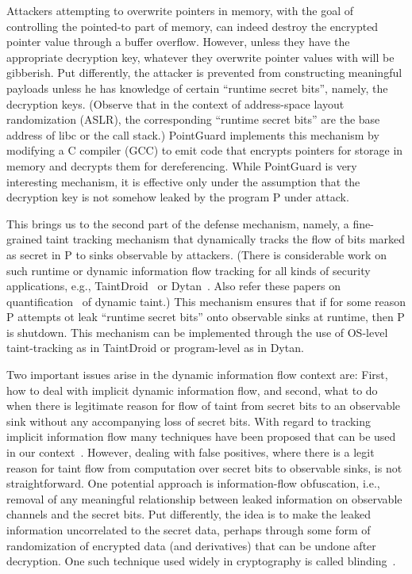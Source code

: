   Attackers attempting to overwrite pointers in memory, with the goal
  of controlling the pointed-to part of memory, can indeed destroy the
  encrypted pointer value through a buffer overflow. However, unless
  they have the appropriate decryption key, whatever they overwrite
  pointer values with will be gibberish. Put differently, the attacker
  is prevented from constructing meaningful payloads unless he has
  knowledge of certain ``runtime secret bits'', namely, the decryption
  keys. (Observe that in the context of address-space layout
  randomization (ASLR), the corresponding ``runtime secret bits'' are
  the base address of libc or the call stack.) PointGuard implements
  this mechanism by modifying a C compiler (GCC) to emit code that
  encrypts pointers for storage in memory and decrypts them for
  dereferencing. While PointGuard is very interesting mechanism, it is
  effective only under the assumption that the decryption key is not
  somehow leaked by the program P under attack.

  This brings us to the second part of the defense mechanism, namely,
  a fine-grained taint tracking mechanism that dynamically tracks the
  flow of bits marked as secret in P to sinks observable by
  attackers. (There is considerable work on such runtime or dynamic
  information flow tracking for all kinds of security applications,
  e.g., TaintDroid~\cite{enck2014taintdroid} or
  Dytan~\cite{clause2007dytan}. Also refer these papers on
  quantification~\cite{schwartz2010all,kang2011dta++} of dynamic
  taint.) This mechanism ensures that if for some reason P attempts ot
  leak ``runtime secret bits'' onto observable sinks at runtime, then
  P is shutdown. This mechanism can be implemented through the use of
  OS-level taint-tracking as in TaintDroid or program-level as in
  Dytan.

  Two important issues arise in the dynamic information flow context
  are: First, how to deal with implicit dynamic information flow, and
  second, what to do when there is legitimate reason for flow of taint
  from secret bits to an observable sink without any accompanying loss
  of secret bits. With regard to tracking implicit information flow
  many techniques have been proposed that can be used in our
  context~\cite{schwartz2010all}. However, dealing with false
  positives, where there is a legit reason for taint flow from
  computation over secret bits to observable sinks, is not
  straightforward. One potential approach is information-flow
  obfuscation, i.e., removal of any meaningful relationship between
  leaked information on observable channels and the secret bits. Put
  differently, the idea is to make the leaked information uncorrelated
  to the secret data, perhaps through some form of randomization of
  encrypted data (and derivatives) that can be undone after
  decryption. One such technique used widely in cryptography is called
  blinding~\cite{rsa-blinding}.

